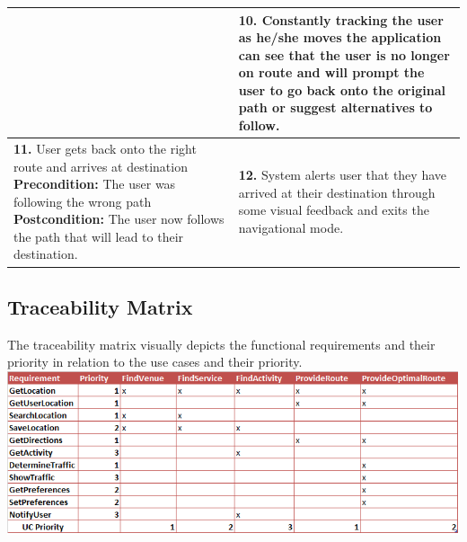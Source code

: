 \documentclass[a4paper,12pt]{article}
\begin{document}
\begin{table}[!htbp]
\begin{tabular}{|L|L|}
& \textbf{10.} Constantly tracking the user as he/she moves the application can see that the user is no longer on route and will prompt the user to go back onto the original path or suggest alternatives to follow. \linebreak \linebreak
\\
\hline
\textbf{11.} User gets back onto the right route and arrives at destination \linebreak \linebreak
\textbf{Precondition:} The user was following the wrong path \linebreak 
\textbf{Postcondition:} The user now follows the path that will lead to their destination.
& \textbf{12.} System alerts user that they have arrived at their destination through some visual feedback and exits the navigational mode. \linebreak
\\
\hline	
\end{tabular}
\egroup	
\end{table}

\subsection{Traceability Matrix}
The traceability matrix visually depicts the functional requirements and their priority in relation to the use cases and their priority. \\
\includegraphics[width=\textwidth]{images/trmatrix.png}
\end{document}
